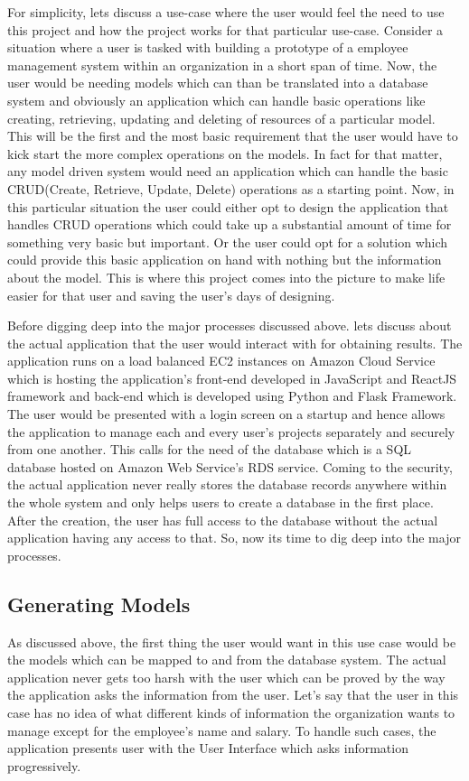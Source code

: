 \documentclass[letterpaper, 10 pt, conference]{ieeeconf}
\begin{document}
For simplicity, lets discuss a use-case where the user would feel the need to use this project and how the project works for that particular use-case. Consider a situation where a user is tasked with building a prototype of a employee management system within an organization in a short span of time. Now, the user would be needing models which can than be translated into a database system and obviously an application which can handle basic operations like creating, retrieving, updating and deleting of resources of a particular model. This will be the first and the most basic requirement that the user would have to kick start the more complex operations on the models. In fact for that matter, any model driven system would need an application which can handle the basic CRUD(Create, Retrieve, Update, Delete) operations as a starting point. Now, in this particular situation the user could either opt to design the application that handles CRUD operations which could take up a substantial amount of time for something very basic but important. Or the user could opt for a solution which could provide this basic application on hand with nothing but the information about the model. This is where this project comes into the picture to make life easier for that user and saving the user’s days of designing.

Before digging deep into the major processes discussed above. lets discuss about the actual application that the user would interact with for obtaining results. The application runs on a load balanced EC2 instances on Amazon Cloud Service which is hosting the application’s front-end developed in JavaScript and ReactJS framework and back-end which is developed using Python and Flask Framework. The user would be presented with a login screen on a startup and hence allows the application to manage each and every user’s projects separately and securely from one another. This calls for the need of the database which is a SQL database hosted on Amazon Web Service’s RDS service. Coming to the security, the actual application never really stores the database records anywhere within the whole system and only helps users to create a database in the first place. After the creation, the user has full access to the database without the actual application having any access to that. So, now its time to dig deep into the major processes.
\subsection{Generating Models}
As discussed above, the first thing the user would want in this use case would be the models which can be mapped to and from the database system. The actual application never gets too harsh with the user which can be proved by the way the application asks the information from the user. Let’s say that the user in this case has no idea of what different kinds of information the organization wants to manage except for the employee’s name and salary. To handle such cases, the application presents user with the User Interface which asks information progressively.
\end{document}

